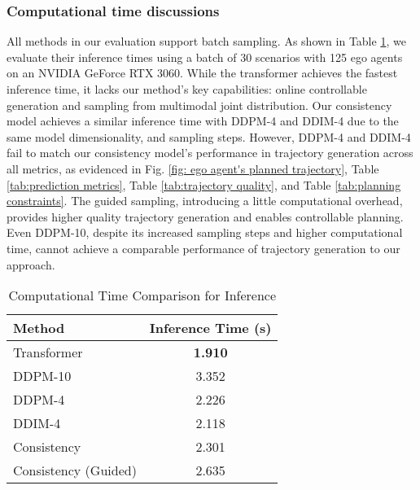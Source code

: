 
\subsubsection{\textbf{Computational time discussions}}

All methods in our evaluation support batch sampling. 
As shown in Table \ref{tab:computation_time}, we evaluate their inference times using a batch of 30 scenarios with 125 ego agents on an NVIDIA GeForce RTX 3060. 
While the transformer achieves the fastest inference time, it lacks our method's key capabilities: online controllable generation and sampling from multimodal joint distribution.
Our consistency model achieves a similar inference time with DDPM-4 and DDIM-4 due to the same model dimensionality, and sampling steps.
However, DDPM-4 and DDIM-4 fail to match our consistency model's performance in trajectory generation across all metrics, as evidenced in Fig. \ref{fig: ego agent's planned trajectory}, Table \ref{tab:prediction metrics}, Table \ref{tab:trajectory quality}, and Table \ref{tab:planning constraints}.
The guided sampling, introducing a little computational overhead, provides higher quality trajectory generation and enables controllable planning.
Even DDPM-10, despite its increased sampling steps and higher computational time,  cannot achieve a comparable performance of trajectory generation to our approach.

\begin{table}[t]
\centering
\caption{Computational Time Comparison for Inference}
\label{tab:computation_time}
\begin{tabular}{lc}
\toprule
Method & Inference Time (s) \\
\midrule
Transformer & \textbf{1.910} \\
\midrule
DDPM-10 & 3.352 \\
DDPM-4 & 2.226 \\
DDIM-4 & 2.118 \\
Consistency & 2.301 \\
Consistency (Guided) & 2.635 \\
\bottomrule
\end{tabular}
\end{table}
